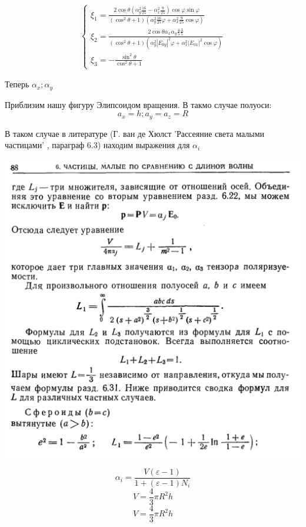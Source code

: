 \documentclass[12pt]{article}
\begin{document}
\begin{large}
\begin{eqnarray*}
\begin{cases}
        \xi_1 = \frac{2 \cos \theta \left( \alpha_y^2 \frac{16}{25} - \alpha_x^2 \frac{9}{25} \right) \cos \varphi \sin \varphi}{\left( \cos^2 \theta + 1 \right)\left( \alpha_y^2 \frac{16}{25} \varphi + \alpha_x^2 \frac{9}{25} \cos \varphi \right)} \\
        \xi_2 = \frac{2 \cos \theta \alpha_x \alpha_y \frac{4}{5} \frac{3}{5}}{\left( \cos^2 \theta + 1 \right)\left( \alpha_y^2 |E_{0y}|^2 \varphi + \alpha_x^2 |E_{0x}|^2 \cos \varphi \right)} \\
        \xi_3 = - \frac{\sin^2 \theta}{\cos^2 \theta + 1}
    \end{cases}
\end{eqnarray*}
\par Теперь $\alpha_x; \alpha_y$
\par Приблизим нашу фигуру Элипсоидом вращения. В такмо случае полуоси:
\[
    a_x = h; a_y = a_z = R
\]
\par В таком случае в литературе (Г. ван де Хюлст 'Рассеяние света малыми частицами' , параграф 6.3) находим выражения для $\alpha_i$
\par
\includegraphics[width=1\textwidth]{photo_2.png}
\par
\[
    \alpha_i = \frac{V \left( \varepsilon - 1 \right)}{1 + \left( \varepsilon - 1 \right) N_i}
\]
\[
    V = \frac{4}{3}\pi R^2 h
\]
\[
    V = \frac{4}{3}\pi R^2 h
\]
\end{large}
\end{document}
